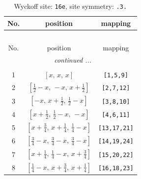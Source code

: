 \documentclass[fleqn,8pt]{jsarticle}
\begin{document}
\renewcommand{\arraystretch}{1.2}
\begin{longtable}{ccc}
\caption{Wyckoff site: {\tt 16e}, site symmetry: {\tt .3.}}
 \\
 \hline \hline
No. & position & mapping \\ \hline \endfirsthead

\multicolumn{2}{l}{\tablename\ \thetable{}} \\
 \hline \hline
No. & position & mapping \\ \hline \endhead

 \hline \hline
\multicolumn{2}{r}{\footnotesize\it continued ...} \\ \endfoot

 \hline \hline
\multicolumn{2}{r}{} \\ \endlastfoot

1 & $\left[ x,\, x,\, x \right]$ & {\tt [1,5,9]} \\ \hline
2 & $\left[ \frac{1}{2} - x,\, - x,\, x + \frac{1}{2} \right]$ & {\tt [2,7,12]} \\ \hline
3 & $\left[ - x,\, x + \frac{1}{2},\, \frac{1}{2} - x \right]$ & {\tt [3,8,10]} \\ \hline
4 & $\left[ x + \frac{1}{2},\, \frac{1}{2} - x,\, - x \right]$ & {\tt [4,6,11]} \\ \hline
5 & $\left[ x + \frac{3}{4},\, x + \frac{1}{4},\, \frac{1}{4} - x \right]$ & {\tt [13,17,21]} \\ \hline
6 & $\left[ \frac{3}{4} - x,\, \frac{3}{4} - x,\, \frac{3}{4} - x \right]$ & {\tt [14,19,24]} \\ \hline
7 & $\left[ x + \frac{1}{4},\, \frac{1}{4} - x,\, x + \frac{3}{4} \right]$ & {\tt [15,20,22]} \\ \hline
8 & $\left[ \frac{1}{4} - x,\, x + \frac{3}{4},\, x + \frac{1}{4} \right]$ & {\tt [16,18,23]} \\
\end{longtable}
\renewcommand{\arraystretch}{1.2}
\end{document}
